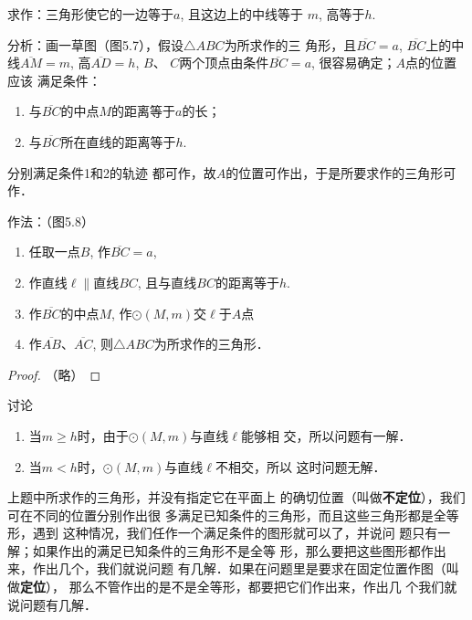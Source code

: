 求作：三角形使它的一边等于$a$, 且这边上的中线等于
$m$, 高等于$h$.

分析：画一草图（图5.7），假设$\triangle ABC$为所求作的三
角形，且$\overline{BC}=a$, $\overline{BC}$上的中线$\overline{AM}=m$, 高$\overline{AD}=h$, $B$、
$C$两个顶点由条件$\overline{BC}=a$, 很容易确定；$A$点的位置应该
满足条件：
\begin{enumerate}
    \item 与$\overline{BC}$的中点$M$的距离等于$a$的长；
    \item 与$\overline{BC}$所在直线的距离等于$h$.
\end{enumerate}
分别满足条件1和2的轨迹
都可作，故$A$的位置可作出，于是所要求作的三角形可作．

作法：（图5.8）
\begin{figure}[htp]
    \centering
{}
    \caption{}
\end{figure}

\begin{enumerate}
    \item 任取一点$B$, 作$\overline{BC}=a$,
    \item 作直线$\ell\parallel$直线$BC$,
    且与直线$BC$的距离等于$h$.
    \item 作$\overline{BC}$的中点$M$, 作$\odot(M,m)$交$\ell$于$A$点
    \item  作$\overline{AB}$、$\overline{AC}$, 则$\triangle
    ABC$为所求作的三角形．
\end{enumerate}

\begin{proof}
    （略）
\end{proof}

讨论
\begin{enumerate}
    \item 当$m\ge h$时，由于$\odot(M,m)$与直线$\ell$能够相
交，所以问题有一解．
\item 当$m<h$时，$\odot(M,m)$与直线$\ell$不相交，所以
这时问题无解．
\end{enumerate}

\begin{rmk}
    上题中所求作的三角形，并没有指定它在平面上
    的确切位置（叫做\textbf{不定位}），我们可在不同的位置分别作出很
    多满足已知条件的三角形，而且这些三角形都是全等形，遇到
    这种情况，我们任作一个满足条件的图形就可以了，并说问
    题只有一解；如果作出的满足已知条件的三角形不是全等
    形，那么要把这些图形都作出来，作出几个，我们就说问题
    有几解．如果在问题里是要求在固定位置作图（叫做\textbf{定位}），
    那么不管作出的是不是全等形，都要把它们作出来，作出几
    个我们就说问题有几解． 
\end{rmk}


